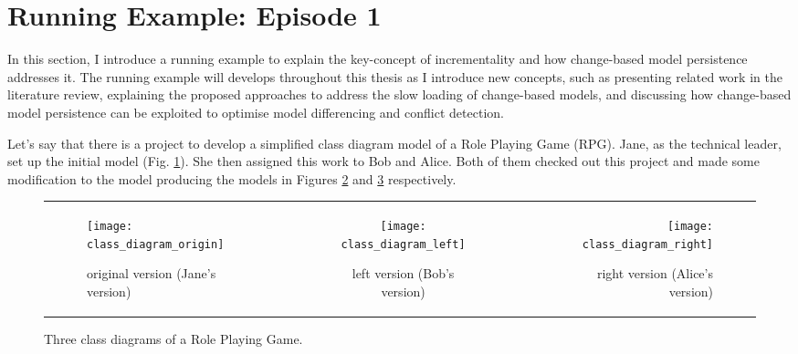 \section{Running Example: Episode 1}
\label{sec:running_example_1}
In this section, I introduce a running example to explain the key-concept of incrementality and how change-based model persistence addresses it. The running example will develops throughout this thesis as I introduce new concepts, such as presenting related work in the literature review, explaining the proposed approaches to address the slow loading of change-based models, and discussing how change-based model persistence can be exploited to optimise model differencing and conflict detection.

Let's say that there is a project to develop a simplified class diagram model of a Role Playing Game (RPG). Jane, as the technical leader, set up the initial model (Fig. \ref{fig:class_diagram_origin}). She then assigned this work to Bob and Alice. Both of them checked out this project and made some modification to the model producing the models in Figures \ref{fig:class_diagram_left} and \ref{fig:class_diagram_right} respectively.

\begin{figure}[ht]
    \begin{tabular}{l|c|r}
        \begin{subfigure}[t]{0.31\linewidth}
            \texttt{[image: class\_diagram\_origin]}
            \caption{original version (Jane's version)}
            \label{fig:class_diagram_origin}
        \end{subfigure}
        &
        \begin{subfigure}[t]{0.31\linewidth}
            \texttt{[image: class\_diagram\_left]}
            \caption{left version (Bob's version)}
            \label{fig:class_diagram_left}
        \end{subfigure}
        &
        \begin{subfigure}[t]{0.31\linewidth}
            \texttt{[image: class\_diagram\_right]}
            \caption{right version (Alice's version)}
            \label{fig:class_diagram_right}
        \end{subfigure}
    \end{tabular}
    \caption{Three class diagrams of a Role Playing Game.}
    \label{fig:class_diagram_rpg}
\end{figure}

